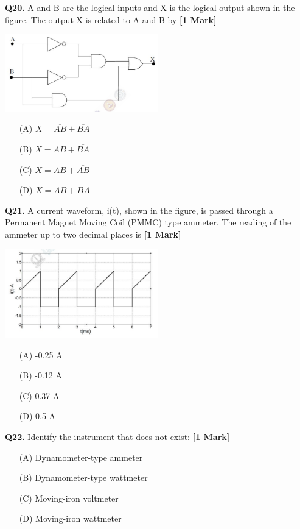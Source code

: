 \documentclass[11pt]{article}
\newcommand{\questiona}[2]{
    \noindent\textbf{Q#2.} #1 \hfill \textbf{[1 Mark]}
}
\begin{document}
\questiona{A and B are the logical inputs and X is the logical output shown in the figure. The output X is related to A and B by}{20}
\begin{center}
\includegraphics[width=0.5\textwidth]{figures/20.png}
\end{center}
\begin{enumerate}
    \item[(A)] \( X = \overline{AB} + \overline{BA} \)  
    \item[(B)] \( X = AB + \overline{BA} \)  
    \item[(C)] \( X = AB + \overline{AB} \)  
    \item[(D)] \( X = \overline{AB} + \overline{BA} \)  
\end{enumerate}
\vspace{0.5cm}

\questiona{A current waveform, i(t), shown in the figure, is passed through a Permanent Magnet Moving Coil (PMMC) type ammeter. The reading of the ammeter up to two decimal places is}{21}
\begin{center}
\includegraphics[width=0.5\textwidth]{figures/21.png}
\end{center}
\begin{enumerate}
    \item[(A)] -0.25 A  
    \item[(B)] -0.12 A  
    \item[(C)] 0.37 A  
    \item[(D)] 0.5 A  
\end{enumerate}
\vspace{0.5cm}

\questiona{Identify the instrument that does not exist:}{22}
\begin{enumerate}
    \item[(A)] Dynamometer-type ammeter  
    \item[(B)] Dynamometer-type wattmeter  
    \item[(C)] Moving-iron voltmeter  
    \item[(D)] Moving-iron wattmeter  
\end{enumerate}
\vspace{0.5cm}
\end{document}
